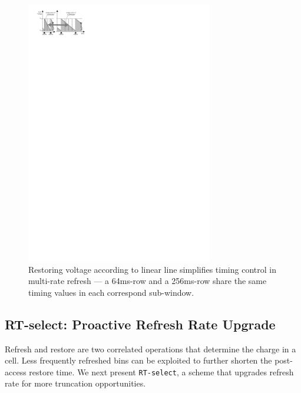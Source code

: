 \begin{figure}[htbp]
\begin{center}
\vspace{-0.1in}
\centering
\includegraphics[width=3.2in]{figures/HPCA16/rt_next_m.pdf}
\vspace{-0.2in}
\caption{Restoring voltage according to linear line simplifies timing control in multi-rate refresh --- a 64ms-row and a 256ms-row share the same timing values in each correspond sub-window.}

\label{fig:rtnext_m}
\vspace{-0.45in}
\end{center}
\end{figure}



\subsection{RT-select: Proactive Refresh Rate Upgrade}
Refresh and restore are two correlated operations that determine the charge in a cell. Less frequently refreshed bins can be exploited to further shorten the post-access restore time. 
We next present {\tt RT-select}, a scheme that upgrades refresh rate for more truncation opportunities. 

